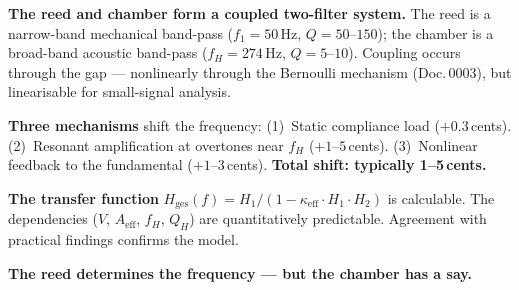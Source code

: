 \documentclass[11pt,a4paper]{article}
\begin{document}
\begin{keybox}
\textbf{The reed and chamber form a coupled two-filter system.} The reed is a narrow-band mechanical band-pass ($f_1 = 50$\,Hz, $Q = 50$--$150$); the chamber is a broad-band acoustic band-pass ($f_H = 274$\,Hz, $Q = 5$--$10$). Coupling occurs through the gap --- nonlinearly through the Bernoulli mechanism (Doc.\,0003), but linearisable for small-signal analysis.

\textbf{Three mechanisms} shift the frequency: (1)~Static compliance load ($+0{.}3$\,cents). (2)~Resonant amplification at overtones near $f_H$ ($+1$--$5$\,cents). (3)~Nonlinear feedback to the fundamental ($+1$--$3$\,cents). \textbf{Total shift: typically 1--5\,cents.}

\textbf{The transfer function} $H_\text{ges}(f) = H_1/(1 - \kappa_\text{eff} \cdot H_1 \cdot H_2)$ is calculable. The dependencies ($V$, $A_\text{eff}$, $f_H$, $Q_H$) are quantitatively predictable. Agreement with practical findings confirms the model.

\textbf{The reed determines the frequency --- but the chamber has a say.}
\end{keybox}
\end{document}
